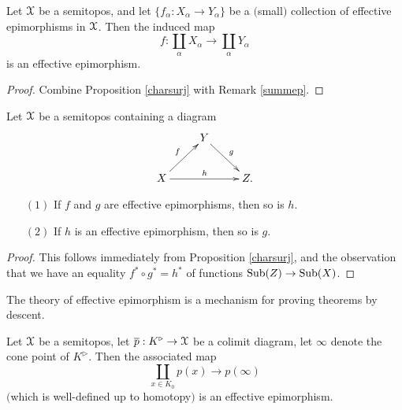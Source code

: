\begin{corollary}\label{sumepi}
Let $\operatorname{\mathcal{X}}$ be a semitopos, and let $\{ f_{\alpha}: X_{\alpha} \rightarrow Y_{\alpha} \}$ be a $($small$)$ collection of effective epimorphisms in $\operatorname{\mathcal{X}}$. Then the induced map
$$ f: \coprod_{\alpha} X_{\alpha} \rightarrow \coprod_{\alpha} Y_{\alpha} $$
is an effective epimorphism.
\end{corollary}

\begin{proof}
Combine Proposition \ref{charsurj} with Remark \ref{summep}.
\end{proof}

\begin{corollary}\label{composite}
Let $\operatorname{\mathcal{X}}$ be a semitopos containing a diagram
$$ \xymatrix{ & Y \ar[dr]^{g} & \\
X \ar[ur]^{f} \ar[rr]^{h} & & Z. }$$
\begin{itemize}
\item[$(1)$] If $f$ and $g$ are effective epimorphisms, then so is $h$.
\item[$(2)$] If $h$ is an effective epimorphism, then so is $g$.
\end{itemize}
\end{corollary}

\begin{proof}
This follows immediately from Proposition \ref{charsurj}, and the observation
that we have an equality $f^{\ast} \circ g^{\ast} = h^{\ast}$ of functions
$\operatorname{Sub}(Z) \rightarrow \operatorname{Sub}(X)$.
\end{proof}

The theory of effective epimorphism is a mechanism for
proving theorems by descent.

\begin{lemma}\label{epie}
Let $\operatorname{\mathcal{X}}$ be a semitopos, let $\overline{p}: K^{\triangleright} \rightarrow \operatorname{\mathcal{X}}$ be
a colimit diagram, let $\infty$ denote the cone point of $K^{\triangleright}$. Then
the associated map
$$ \coprod_{x \in K_0} p(x) \rightarrow p(\infty)$$
$($which is well-defined up to homotopy$)$ is an effective epimorphism.
\end{lemma}

